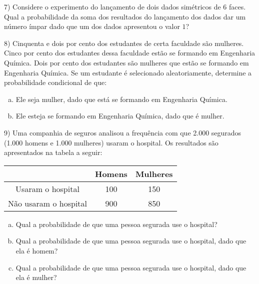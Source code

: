 \documentclass{article}
\begin{document}
\vspace{5px}

7) Considere o experimento do lançamento de dois dados simétricos de 6 faces. Qual
a probabilidade da soma dos resultados do lançamento dos dados dar um número ímpar dado que um dos dados apresentou o valor $1$?

\vspace{5px}

8) Cinquenta e dois por cento dos estudantes de certa faculdade são mulheres. 
Cinco por cento dos estudantes dessa faculdade estão se formando em Engenharia Química.
 Dois por cento dos estudantes são mulheres que estão se formando em Engenharia Química.
  Se um estudante é selecionado aleatoriamente, determine a probabilidade condicional de que:

\begin{enumerate}[a)]
    \item Ele seja mulher, dado que está se formando em Engenharia Química.
    \item Ele esteja se formando em Engenharia Química, dado que é mulher.
\end{enumerate}

\vspace{5px}

9) Uma companhia de seguros analisou a frequência com que 2.000 segurados (1.000 homens e 1.000 mulheres) usaram o hospital. Os resultados são apresentados na tabela a seguir:

\begin{table}[H]
\centering
\begin{tabular}{ccc}
\hline
                      & Homens & Mulheres \\ \hline
Usaram o hospital     & 100    & 150      \\
Não usaram o hospital & 900    & 850      \\ \hline
\end{tabular}
\end{table}

\begin{enumerate}[a)]
    \item Qual a probabilidade de que uma pessoa segurada use o hospital?
    \item Qual a probabilidade de que uma pessoa segurada use o hospital, dado que ela é homem?
    \item Qual a probabilidade de que uma pessoa segurada use o hospital, dado que ela é mulher?
\end{enumerate}
\end{document}
